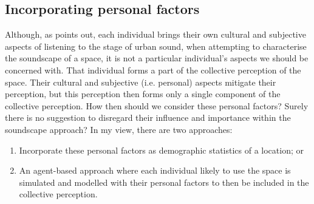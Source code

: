

\subsection{Incorporating personal factors}
Although, as \citet{Droumeva2021sound} points out, each individual brings their own cultural and subjective aspects of listening to the stage of urban sound, when attempting to characterise the soundscape of a space, it is not a particular individual's aspects we should be concerned with. That individual forms a part of the collective perception of the space. Their cultural and subjective (i.e. personal) aspects mitigate their perception, but this perception then forms only a single component of the collective perception. How then should we consider these personal factors? Surely there is no suggestion to disregard their influence and importance within the soundscape approach? In my view, there are two approaches:

\begin{enumerate}
  \item Incorporate these personal factors as demographic statistics of a location; or
  \item An agent-based approach where each individual likely to use the space is simulated and modelled with their personal factors to then be included in the collective perception.
\end{enumerate}

